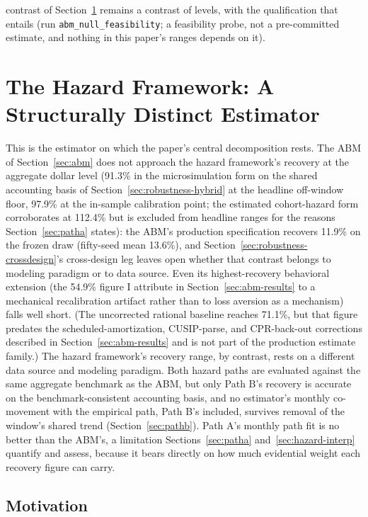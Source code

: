 \documentclass[12pt]{article}
\begin{document}
contrast of Section~\ref{sec:hazard} remains a contrast of levels, with the qualification that entails (run \texttt{abm\_null\_feasibility}; a feasibility probe, not a pre-committed estimate, and nothing in this paper's ranges depends on it).

\section{The Hazard Framework: A Structurally Distinct Estimator}\label{sec:hazard}

This is the estimator on which the paper's central decomposition rests. The ABM of Section~\ref{sec:abm} does not approach the hazard framework's recovery at the aggregate dollar level (91.3\% in the microsimulation form on the shared accounting basis of Section~\ref{sec:robustness-hybrid} at the headline off-window floor, 97.9\% at the in-sample calibration point; the estimated cohort-hazard form corroborates at 112.4\% but is excluded from headline ranges for the reasons Section~\ref{sec:patha} states): the ABM's production specification recovers 11.9\% on the frozen draw (fifty-seed mean 13.6\%), and Section~\ref{sec:robustness-crossdesign}'s cross-design leg leaves open whether that contrast belongs to modeling paradigm or to data source. Even its highest-recovery behavioral extension (the 54.9\% figure I attribute in Section~\ref{sec:abm-results} to a mechanical recalibration artifact rather than to loss aversion as a mechanism) falls well short. (The uncorrected rational baseline reaches 71.1\%, but that figure predates the scheduled-amortization, CUSIP-parse, and CPR-back-out corrections described in Section~\ref{sec:abm-results} and is not part of the production estimate family.) The hazard framework's recovery range, by contrast, rests on a different data source and modeling paradigm. Both hazard paths are evaluated against the same aggregate benchmark as the ABM, but only Path B's recovery is accurate on the benchmark-consistent accounting basis, and no estimator's monthly co-movement with the empirical path, Path B's included, survives removal of the window's shared trend (Section~\ref{sec:pathb}). Path A's monthly path fit is no better than the ABM's, a limitation Sections~\ref{sec:patha} and~\ref{sec:hazard-interp} quantify and assess, because it bears directly on how much evidential weight each recovery figure can carry.

\subsection{Motivation}\label{sec:hazard-motivation}
\end{document}
